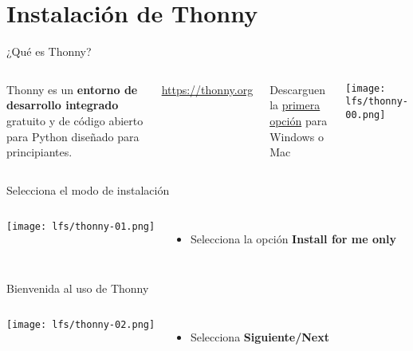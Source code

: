 
\section{Instalación de Thonny}

\begin{frame}[c]{¿Qué es Thonny?}
    \begin{columns}
        Thonny es un \textbf{entorno de desarrollo integrado} gratuito y
        de código abierto para Python diseñado para principiantes.
        \vspace{\baselineskip}

        \href{https://thonny.org}{https://thonny.org}

        \vspace{\baselineskip}
        Descarguen la \underline{primera opción} para Windows o Mac

        \begin{center}
            \texttt{[image: lfs/thonny-00.png]}
        \end{center}
    \end{columns}
\end{frame}

\begin{frame}[c]{Selecciona el modo de instalación}
    \begin{columns}
        \begin{center}
            \texttt{[image: lfs/thonny-01.png]}
        \end{center}
        \begin{itemize}
          \item Selecciona la opción \textbf{Install for me only}
        \end{itemize}
    \end{columns}
\end{frame}

\begin{frame}[c]{Bienvenida al uso de Thonny}
    \begin{columns}
        \begin{center}
            \texttt{[image: lfs/thonny-02.png]}
        \end{center}
        \begin{itemize}
          \item Selecciona \textbf{Siguiente/Next}
        \end{itemize}
    \end{columns}
\end{frame}

